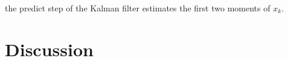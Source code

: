 \documentclass[mscthesis]{usiinfthesis}
\begin{document}
the predict step of the Kalman filter estimates the first two moments of $x_k$. 



%

\chapter{Discussion}





%
% 
 
\end{document}

